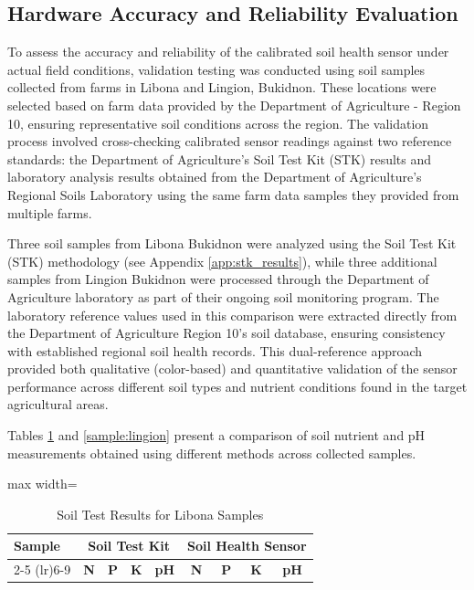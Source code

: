 {	\subsection{Hardware Accuracy and Reliability Evaluation}
	
	To assess the accuracy and reliability of the calibrated soil health sensor under actual field conditions, validation testing was conducted using soil samples collected from farms in Libona and Lingion, Bukidnon. These locations were selected based on farm data provided by the Department of Agriculture - Region 10, ensuring representative soil conditions across the region. The validation process involved cross-checking calibrated sensor readings against two reference standards: the Department of Agriculture's Soil Test Kit (STK) results and laboratory analysis results obtained from the Department of Agriculture's Regional Soils Laboratory using the same farm data samples they provided from multiple farms.
	
	Three soil samples from Libona Bukidnon were analyzed using the Soil Test Kit (STK) methodology (see Appendix \ref{app:stk_results}), while three additional samples from Lingion Bukidnon were processed through the Department of Agriculture laboratory as part of their ongoing soil monitoring program. The laboratory reference values used in this comparison were extracted directly from the Department of Agriculture Region 10's soil database, ensuring consistency with established regional soil health records. This dual-reference approach provided both qualitative (color-based) and quantitative validation of the sensor performance across different soil types and nutrient conditions found in the target agricultural areas.
	
	Tables \ref{sample:libona} and \ref{sample:lingion} present a comparison of soil nutrient and pH measurements obtained using different methods across collected samples.
	
	\begin{table}[htbp]
		\centering
		\footnotesize
		\renewcommand{\arraystretch}{1.2}
		\caption{Soil Test Results for Libona Samples}
		\label{sample:libona}
		
		\begin{adjustbox}{max width=\textwidth}
			\begin{tabular}{lcccccccc}
				\toprule
				\multirow{2}{*}{\textbf{Sample}} & \multicolumn{4}{c}{\textbf{Soil Test Kit}} & \multicolumn{4}{c}{\textbf{Soil Health Sensor}} \\
				\cmidrule(lr){2-5} \cmidrule(lr){6-9}
				& \textbf{N} & \textbf{P} & \textbf{K} & \textbf{pH} & \textbf{N} & \textbf{P} & \textbf{K} & \textbf{pH} \\
				\midrule
				

\end{tabular}
\end{adjustbox}
\end{table}}
